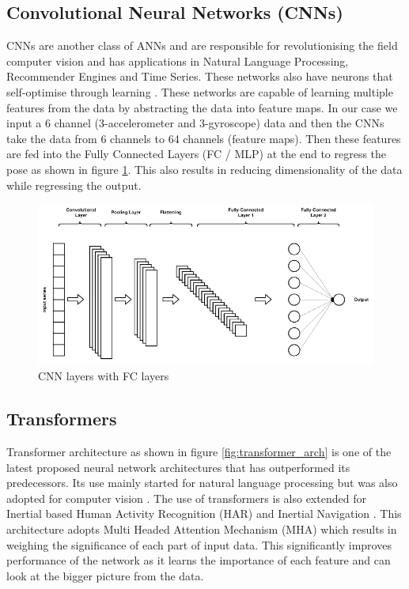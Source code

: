\subsection{Convolutional Neural Networks (CNNs)}
CNNs are another class of ANNs and are responsible for revolutionising the field computer vision and has applications in Natural Language Processing, Recommender Engines and Time Series. These networks also have neurons that self-optimise through learning \citep{cnn2015introduction}. These networks are capable of learning multiple features from the data by abstracting the data into feature maps. In our case we input a 6 channel (3-accelerometer and 3-gyroscope) data and then the CNNs take the data from 6 channels to 64 channels (feature maps). Then these features are fed into the Fully Connected Layers (FC / MLP) at the end to regress the pose as shown in figure \ref{fig:cnn_fc}. This also results in reducing dimensionality of the data while regressing the output. 

\begin{figure}[H]
    \centering
    \includegraphics[scale=0.4]{images/fig_chapter2/nns/cnn_mlp.png}
    \caption{CNN layers with FC layers}
    \label{fig:cnn_fc}
\end{figure}

\subsection{Transformers}
Transformer architecture as shown in figure \ref{fig:transformer_arch} is one of the latest proposed neural network architectures that has outperformed its predecessors. Its use mainly started for natural language processing \citep{vaswani2017attention} but was also adopted for computer vision \citep{dosovitskiy2020image}. The use of transformers is also extended for Inertial based Human Activity Recognition (HAR) \cite{shavit2021boosting} and Inertial Navigation \citep{rao2022ctin}. This architecture adopts Multi Headed Attention Mechanism (MHA) \citep{vaswani2017attention} which results in weighing the significance of each part of input data. This significantly improves performance of the network as it learns the importance of each feature and can look at the bigger picture from the data.

